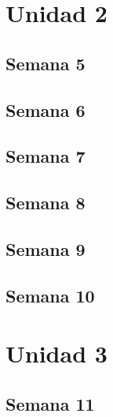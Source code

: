 \documentclass[
]{book}
\begin{document}
\hypertarget{unidad-2}{%
\section*{Unidad 2}\label{unidad-2}}

\hypertarget{semana-5}{%
\subsection*{Semana 5}\label{semana-5}}

\hypertarget{semana-6}{%
\subsection*{Semana 6}\label{semana-6}}

\hypertarget{semana-7}{%
\subsection*{Semana 7}\label{semana-7}}

\hypertarget{semana-8}{%
\subsection*{Semana 8}\label{semana-8}}

\hypertarget{semana-9}{%
\subsection*{Semana 9}\label{semana-9}}

\hypertarget{semana-10}{%
\subsection*{Semana 10}\label{semana-10}}

\hypertarget{unidad-3}{%
\section*{Unidad 3}\label{unidad-3}}

\hypertarget{semana-11}{%
\subsection*{Semana 11}\label{semana-11}}
\end{document}

